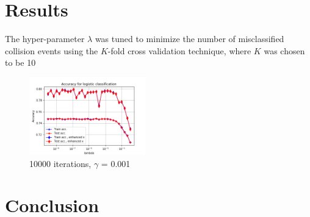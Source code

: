 \documentclass[10pt,conference,compsocconf]{IEEEtran}
\begin{document}

\section*{Results}
The hyper-parameter $\lambda$ was tuned to minimize the number of misclassified collision events using the $K$-fold cross validation technique, where $K$ was chosen to be 10
\begin{figure}[H]
	\centering
	\includegraphics[width=0.45\textwidth]{accuracy_logistic.png}
	\caption{10000 iterations, $\gamma$ = 0.001}
\end{figure}


\section*{Conclusion}



\end{document}
